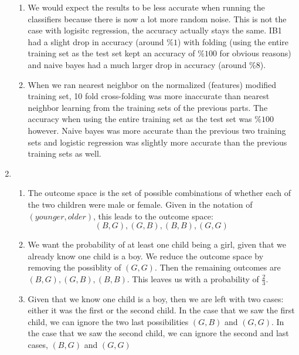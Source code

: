 \documentclass{article}
\begin{document}
\begin{enumerate}
\begin{enumerate}
                \item
                   We would expect the results to be less accurate when running the classifiers because 				there is now a lot more random noise. This is not the case with logisitc regression, the 				accuracy actually stays the same. IB1 had a slight drop in accuracy (around $\%1$) with 				folding (using the entire training set as the test set kept an accuracy of $\%100$ for 				obvious reasons) and naive bayes had a much larger drop in accuracy (around $\%8$).
                \item
                   When we ran nearest neighbor on the normalized (features) modified training set, 10 fold 		cross-folding was more inaccurate than nearest neighbor learning from the training sets 			of the previous parts. The accuracy when using the entire training set as the test set was 			$\%100$ however. Naive bayes was  more accurate than the previous two training sets 				and logistic regression was slightly more accurate than the previous training sets as well.   
            \end{enumerate}
        \item
            \begin{enumerate}
                \item The outcome space is the set of possible combinations of whether
                      each of the two children were male or female. Given in the notation
                      of $(younger, older)$, this leads to the outcome space:
                      $$
                        (B, G), (G, B), (B, B), (G, G)
                      $$
                \item We want the probability of at least one child being a girl, given
                      that we already know one child is a boy. We reduce the outcome space
                      by removing the possiblity of $(G, G)$. Then the remaining outcomes
                      are $(B, G), (G, B), (B, B)$. This leaves us with a probability
                      of $\frac{2}{3}$.
                \item Given that we know one child is a boy, then we are left with two
                    cases: either it was the first or the second child. In the case that
                    we saw the first child, we can ignore the two last possibilities
                    $(G, B)$ and $(G, G)$. In the case that we saw the second child, we
                    can ignore the second and last cases, $(B, G)$ and $(G, G)$\\

\end{enumerate}
\end{enumerate}
\end{document}
